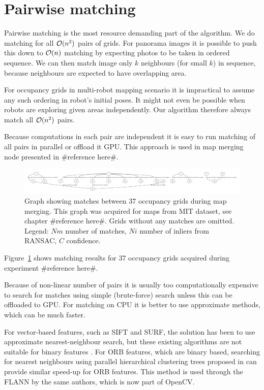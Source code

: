 
\section{Pairwise matching} %
\label{sec:pairwise_matching}

Pairwise matching is the most resource demanding part of the algorithm. We do matching for all $\operatorname{\mathcal{O}}(n^2)$ pairs of grids. For panorama images it is possible to push this down to $\operatorname{\mathcal{O}}(n)$ matching by expecting photos to be taken in ordered sequence. We can then match image only $k$ neighbours (for small $k$) in sequence, because neighbours are expected to have overlapping area.

For occupancy grids in multi-robot mapping scenario it is impractical to assume any such ordering in robot's initial poses. It might not even be possible when robots are exploring given areas independently. Our algorithm therefore always match all $\operatorname{\mathcal{O}}(n^2)$ pairs.

Because computations in each pair are independent it is easy to run matching of all pairs in parallel or offload it GPU. This approach is used in map merging node presented in \#reference here\#.

\begin{figure}
    \centering
    \includegraphics[width=\textwidth]{../img/matches.pdf}
    \caption{Graph showing matches between $37$ occupancy grids during map merging. This graph was acquired for maps from MIT dataset, see chapter \#reference here\#. Grids without any matches are omitted. Legend: $Nm$ number of matches, $Ni$ number of inliers from \gls{RANSAC}, $C$ confidence.}
    \label{fig:matches}
\end{figure}

Figure~\ref{fig:matches} shows matching results for $37$ occupancy grids acquired during experiment \#reference here\#.

Because of non-linear number of pairs it is usually too computationally expensive to search for matches using simple (brute-force) search unless this can be offloaded to GPU. For matching on CPU it is better to use approximate methods, which can be much faster.

For vector-based features, such as \gls{SIFT} and \gls{SURF}, the solution has been to use approximate nearest-neighbour search, but these existing algorithms are not suitable for binary features \cite{Muja2012}. For \gls{ORB} features, which are binary based, searching for nearest neighbours using parallel hierarchical clustering trees proposed in \cite{Muja2012} can provide similar speed-up for \gls{ORB} features. This method is used through the \gls{FLANN} by the same authors, which is now part of \gls{OpenCV}.

